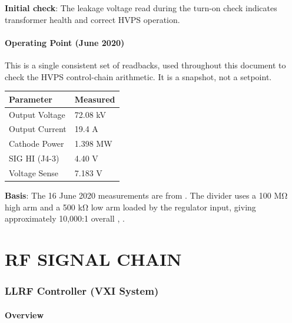 \begin{keynote}
\textbf{Initial check}: The leakage voltage read during the turn-on check indicates transformer health and correct HVPS operation.
\end{keynote}

\subsection{Operating Point (June 2020)}\label{sec:operating-point}

This is a single consistent set of readbacks, used throughout this document to check the HVPS control-chain arithmetic. It is a snapshot, not a setpoint.

\setlength{\LTleft}{\fill}\setlength{\LTright}{\fill}
\begin{longtable}[]{@{}ll@{}}
\toprule\noalign{}
Parameter & Measured \\
\midrule\noalign{}
\endhead
\bottomrule\noalign{}
\endlastfoot
Output Voltage & 72.08 kV \\
Output Current & 19.4 A \\
Cathode Power & 1.398 MW \\
SIG HI (J4-3) & 4.40 V \\
Voltage Sense & 7.183 V \\
\end{longtable}
\setlength{\LTleft}{0pt}\setlength{\LTright}{0pt}

\begin{keynote}
\textbf{Basis}: The 16 June 2020 measurements are from . The divider uses a 100 MΩ high arm and a 500 kΩ low arm loaded by the regulator input, giving approximately 10,000:1 overall , .
\end{keynote}


\FloatBarrier\clearpage
\part{RF SIGNAL CHAIN}


\section{LLRF Controller (VXI System)}\label{sec:vxi-llrf}

\subsection{Overview}

